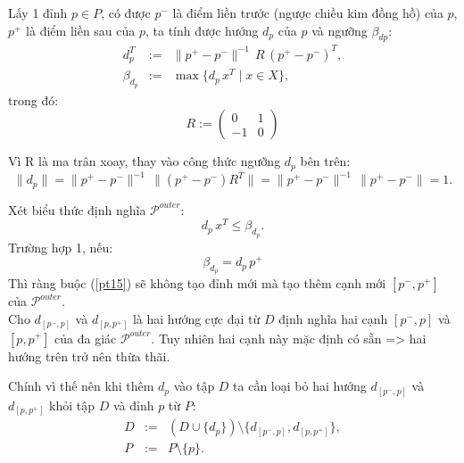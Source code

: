 \documentclass[11pt]{beamer}
\theoremstyle{definition}
\theoremstyle{plain}
\theoremstyle{plain}
\theoremstyle{remark}
\begin{document}
	\begin{frame}
		Lấy 1 đỉnh $p \in P$, có được $p^{-}$ là điểm liền trước (ngược chiều kim đồng hồ) của $p$, $p^{+}$ là điểm liền sau của $p$, ta tính được hướng $d_p$ của $p$ và ngưỡng $\beta_{dp}$:\\
		\begin{equation}\label{def_d_p}
			\begin{array}{lcl}
				d_{p}^T &:=& \|p^+ - p^-\|^{-1}\, R \, (p^+ - p^-)^T, \\
				\beta_{d_{p}} &:=& \max\{d_{p}\, x^T \mid x \in X\},
			\end{array}
		\end{equation}
		trong đó: 
		\begin{equation}\label{rotationmatrix}
			R := \begin{pmatrix}
				0 & 1 \\
				-1 & 0
			\end{pmatrix}
		\end{equation}
	\end{frame}
	\begin{frame}
		Vì R là ma trân xoay, thay vào công thức ngưỡng $d_p$ bên trên:
		\begin{equation}\label{def_d_p1}
			\|d_{p}\| = \|p^+ - p^-\|^{-1}\, \|(p^+ - p^-) R^T\| = \|p^+ - p^-\|^{-1}\, \|p^+ - p^-\| = 1.
		\end{equation}
	\end{frame}
	
	
	\begin{frame}
		Xét biểu thức định nghĩa $\mathcal{P}^{outer}$:
		\begin{equation}\label{pt15}
			d_p\, x^T \leq \beta_{d_p}.
		\end{equation}
		Trường hợp 1, nếu:
		\begin{equation}
			\label{betaequal}
			\beta_{d_p} = d_p\, p^+
		\end{equation}
		Thì ràng buộc (\ref{pt15}) sẽ không tạo đỉnh mới mà tạo thêm cạnh mới $[p^-, p^+]$ của $\mathcal{P}^{outer}$.\\
		Cho $d_{[p^-, p]}$ và $d_{[p, p^+]}$ là hai hướng cực đại từ $D$ định nghĩa hai cạnh $[p^-, p]$ và $[p, p^+]$ của đa giác $\mathcal{P}^{outer}$. Tuy nhiên hai cạnh này mặc định có sẵn => hai hướng trên trở nên thừa thãi. 
		
	\end{frame}
	
	\begin{frame}
		Chính vì thế nên khi thêm $d_p$ vào tập $D$ ta cần loại bỏ hai hướng $d_{[p^-, p]}$ và $d_{[p, p^+]}$ khỏi tập $D$ và đỉnh $p$ từ $P$:
		\begin{equation}\label{newDP2}
			\begin{array}{lcl}
				D &:=& (D \cup \{d_{p}\})\setminus \{d_{[p^-,p]}, d_{[p,p^+]}\}, \\
				P &:=& P \setminus \{p\}.
			\end{array}
		\end{equation}
	\end{frame}
	
\end{document}
